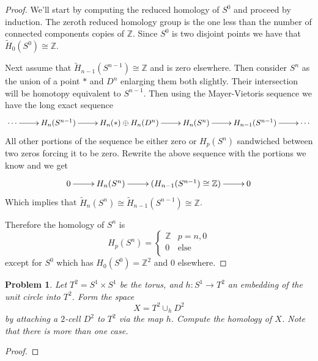 \documentclass[10pt]{article}
\newcommand{\bb}[1]{\mathbb{#1}}
\newcommand{\wt}[1]{\widetilde{#1}}
\theoremstyle{plain}
\newtheorem{problem}{Problem}
\theoremstyle{remark}
\begin{document}
\begin{proof}
  We'll start by computing the reduced homology of $S^0$ and proceed by induction.
  The zeroth reduced homology group is the one less than the number of
  connected components copies of $\bb{Z}$. Since $S^0$ is two disjoint points we
  have that $\wt{H}_0(S^0)\cong\bb{Z}$.

  Next assume that $\wt{H}_{n-1}(S^{n-1})\cong\bb{Z}$ and is zero elsewhere.
  Then consider $S^n$ as the union of a point $*$ and $D^n$ enlarging them both slightly.
  Their intersection will be homotopy equivalent to $S^{n-1}$.
  Then using the Mayer-Vietoris sequence we have the long exact sequence
  \[
    \xymatrix{
      \cdots \ar[r] &H_n(S^{n-1}) \ar[r] & H_n(*)\oplus H_n(D^n)\ar[r] & H_n(S^n) \ar[r]
      &H_{n-1}(S^{n-1})\ar[r] & \cdots \\
    }
  \]
  All other portions of the sequence be either zero or $H_p(S^n)$ sandwiched between
  two zeros forcing it to be zero. Rewrite the above sequence with the portions
  we know and we get
  \[
    \xymatrix{
      0\ar[r] & H_n(S^n) \ar[r]& (H_{n-1}(S^{n-1})\cong\bb{Z})\ar[r] & 0\\
    }
  \]
  Which implies that $\wt{H}_n(S^n)\cong \wt{H}_{n-1}(S^{n-1})\cong\bb{Z}$.

  Therefore the homology of $S^n$ is
  \[ H_p(S^n)=\left\{
      \begin{array}{cc}
        \bb{Z}& p=n,0\\
        0 & \mathrm{else}\\
      \end{array}
    \right.\]
  except for $S^0$ which has $H_0(S^0)=\bb{Z}^2$ and 0 elsewhere.
\end{proof}

\begin{problem}
  Let $T^2 = S^1 \times S^1$ be the torus, and $h: S^1 \to T^2$ an embedding of the unit
  circle into $T^2$. Form the space 
  \begin{equation*}
    X = T^2 \cup_h D^2
  \end{equation*}
  by attaching a $2$-cell $D^2$ to $T^2$ via the map $h$. Compute the homology of $X$.
  Note that there is more than one case.
\end{problem}

\begin{proof}

\end{proof}


\end{document}
